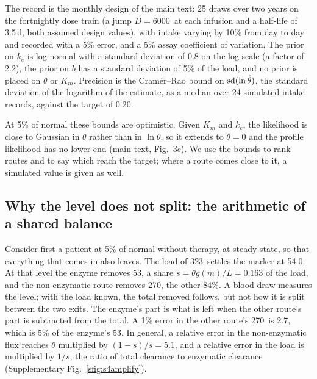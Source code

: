 The record is the monthly design of the main text: 25 draws over two years on the
fortnightly dose train (a jump $D=6000$\um\ at each infusion and a half-life of 3.5\,d, both
assumed design values), with intake varying by 10\% from day to day and recorded with a 5\%
error, and a 5\% assay coefficient of variation. The prior on $k_e$ is log-normal with a standard deviation of
0.8 on the log scale (a factor of 2.2), the prior on $b$ has a standard deviation of 5\% of
the load, and no prior is placed on $\theta$ or $K_m$. Precision is the Cram\'er--Rao bound on
$\operatorname{sd}(\ln \hat\theta)$, the standard deviation of the logarithm of the estimate, as a median over
24 simulated intake records, against the target of 0.20.

At 5\% of normal these bounds are optimistic. Given $K_m$ and $k_e$, the likelihood is close
to Gaussian in $\theta$ rather than in $\ln\theta$, so it extends to $\theta=0$ and the profile
likelihood has no lower end (main text, Fig.~3c). We use the bounds to rank routes and to say
which reach the target; where a route comes close to it, a simulated value is given as well.

\subsection{Why the level does not split: the arithmetic of a shared balance}
\label{si:s4:split}

Consider first a patient at 5\% of normal without therapy, at steady state, so that everything
that comes in also leaves. The load of 323\um\ settles the marker at 54.0\uM. At that level the
enzyme removes 53\um, a share $s=\theta g(m)/L=0.163$ of the load, and the non-enzymatic route
removes 270\um, the other 84\%. A blood draw measures the level; with the load known, the
total removed follows, but not how it is split between the two exits. The
enzyme's part is what is left when the other route's part is subtracted from the total. A
1\% error in the other route's 270\um\ is 2.7\um, which is 5\% of the enzyme's 53\um. In
general, a relative error in the non-enzymatic flux reaches $\theta$ multiplied by
$(1-s)/s=5.1$, and a relative error in the load is multiplied by $1/s$, the ratio of total
clearance to enzymatic clearance (Supplementary Fig.~\ref{sfig:s4amplify}).


